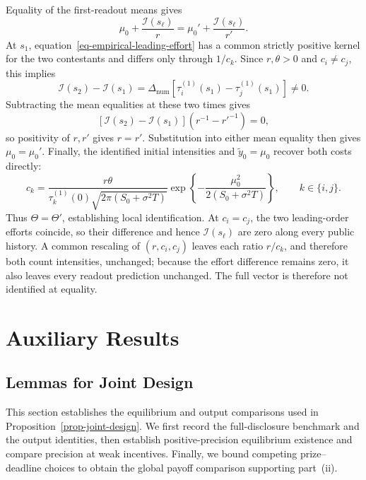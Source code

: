 \documentclass[mnsc]{informs3}
\begin{document}
\begin{APPENDICES}
{Equality of the first-readout means gives
\[
\mu_0+\frac{{\mathscr I}(s_\ell)}r
=\mu_0'+\frac{{\mathscr I}(s_\ell)}{r'}.
\]
At $s_1$, equation~\eqref{eq-empirical-leading-effort} has a common
strictly positive kernel for the two contestants and differs only through
$1/c_k$. Since $r,\theta>0$ and $c_i\ne c_j$, this implies
\[
{\mathscr I}(s_2)-{\mathscr I}(s_1)
=\Delta_{\mathrm{num}}\left[\tau_i^{(1)}(s_1)-\tau_j^{(1)}(s_1)\right]\ne0.
\]
Subtracting the mean equalities at these two times gives
\[
\left[{\mathscr I}(s_2)-{\mathscr I}(s_1)\right]\left(r^{-1}-r'^{-1}\right)=0,
\]
so positivity of $r,r'$ gives $r=r'$. Substitution into either mean
equality then gives $\mu_0=\mu_0'$. Finally, the identified initial
intensities and $\tilde y_0=\mu_0$ recover both costs directly:
\[
c_k=\frac{r\theta}{\tau_k^{(1)}(0)\sqrt{2\pi(S_0+\sigma^2T)}}
\exp\!\left\{-\frac{\mu_0^2}{2(S_0+\sigma^2T)}\right\},
\qquad k\in\{i,j\}.
\]
Thus $\Theta=\Theta'$, establishing local identification. At $c_i=c_j$,
the two leading-order efforts coincide, so their difference and hence
${\mathscr I}(s_\ell)$ are zero along every public history. A common rescaling of
$(r,c_i,c_j)$ leaves each ratio $r/c_k$, and therefore both count
intensities, unchanged; because the effort difference remains zero, it
also leaves every readout prediction unchanged. The full vector is
therefore not identified at equality.
\Halmos
\endproof
}






\section{Auxiliary Results}

\subsection{{Lemmas for Joint Design}}\label{app-joint-design-lemmas}
{
This section establishes the equilibrium and output comparisons used in
Proposition~\ref{prop-joint-design}. We first record the full-disclosure
benchmark and the output identities, then establish positive-precision
equilibrium existence and compare precision at weak incentives. Finally,
we bound competing prize--deadline choices to obtain the global payoff
comparison supporting part~(ii).

}
\end{APPENDICES}
\end{document}

